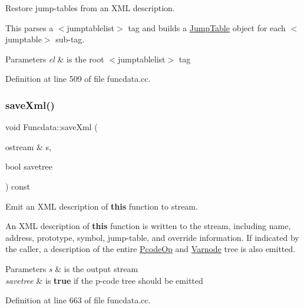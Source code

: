 Restore jump-\/tables from an X\+ML description. 

This parses a $<$jumptablelist$>$ tag and builds a \mbox{\hyperlink{class_jump_table}{Jump\+Table}} object for each $<$jumptable$>$ sub-\/tag. 
\begin{DoxyParams}{Parameters}
{\em el} & is the root $<$jumptablelist$>$ tag \\
\hline
\end{DoxyParams}


Definition at line 509 of file funcdata.\+cc.

\mbox{\label{class_funcdata_a7d1d8baaefe519897b72e8537f0cb335}} 
\subsubsection{\texorpdfstring{saveXml()}{saveXml()}}
{\footnotesize\ttfamily void Funcdata\+::save\+Xml (\begin{DoxyParamCaption}\item[{ostream \&}]{s,  }\item[{bool}]{savetree }\end{DoxyParamCaption}) const}



Emit an X\+ML description of {\bfseries{this}} function to stream. 

An X\+ML description of {\bfseries{this}} function is written to the stream, including name, address, prototype, symbol, jump-\/table, and override information. If indicated by the caller, a description of the entire \mbox{\hyperlink{class_pcode_op}{Pcode\+Op}} and \mbox{\hyperlink{class_varnode}{Varnode}} tree is also emitted. 
\begin{DoxyParams}{Parameters}
{\em s} & is the output stream \\
\hline
{\em savetree} & is {\bfseries{true}} if the p-\/code tree should be emitted \\
\hline
\end{DoxyParams}


Definition at line 663 of file funcdata.\+cc.

